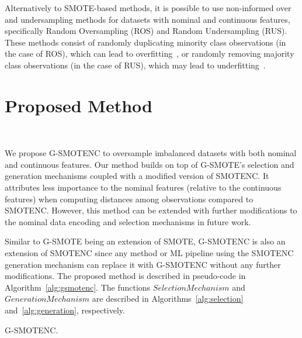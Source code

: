 \documentclass[preprint,12pt]{elsarticle}
\begin{document}
{Alternatively to SMOTE-based methods, it is possible to use non-informed over
and undersampling methods for datasets with nominal and continuous features,
specifically Random Oversampling (ROS) and Random Undersampling (RUS). These
methods consist of randomly duplicating minority class observations (in the
case of ROS), which can lead to overfitting~\cite{park2021combined,
batista2004study}, or randomly removing majority class observations (in the
case of RUS), which may lead to underfitting~\cite{bansal2021analysis}.


\section{Proposed Method}~\label{sec:proposed_method}

We propose G-SMOTENC to oversample imbalanced datasets with both nominal and
continuous features. Our method builds on top of G-SMOTE's selection and
generation mechanisms coupled with a modified version of SMOTENC. It
attributes less importance to the nominal features (relative to the continuous
features) when computing distances among observations compared to SMOTENC.
However, this method can be extended with further modifications to the
nominal data encoding and selection mechanisms in future work. 

Similar to G-SMOTE being an extension of SMOTE, G-SMOTENC is also an extension
of SMOTENC since any method or ML pipeline using the SMOTENC generation
mechanism can replace it with G-SMOTENC without any further modifications. The
proposed method is described in pseudo-code in Algorithm~\ref{alg:gsmotenc}.
The functions $SelectionMechanism$ and $GenerationMechanism$ are described in
Algorithms~\ref{alg:selection} and~\ref{alg:generation}, respectively.

\begin{algorithm}
    \caption{G-SMOTENC.}\label{alg:gsmotenc}
    \DontPrintSemicolon%
    

\end{algorithm}

}
\end{document}
